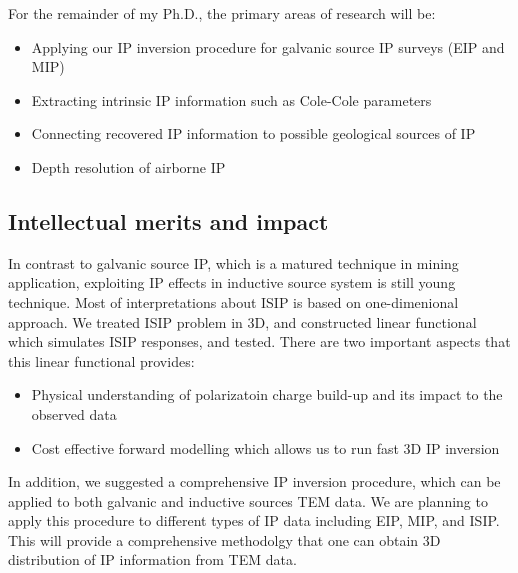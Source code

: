 \documentclass[letterpaper,11pt]{article}
\begin{document}
For the remainder of my Ph.D., the primary areas of research will be:
\begin{itemize}
  \item Applying our IP inversion procedure for galvanic source IP surveys (EIP and MIP)
  \item Extracting intrinsic IP information such as Cole-Cole parameters
  \item Connecting recovered IP information to possible geological sources of IP
  \item Depth resolution of airborne IP
\end{itemize}

\subsection{Intellectual merits and impact}
In contrast to galvanic source IP, which is a matured technique in mining application, exploiting IP effects in inductive source system is still young technique. Most of interpretations about ISIP is based on one-dimenional approach. We treated ISIP problem in 3D, and constructed linear functional which simulates ISIP responses, and tested. There are two important aspects that this linear functional provides:
\begin{itemize}
  \item Physical understanding of polarizatoin charge build-up and its impact to the observed data
  \item Cost effective forward modelling which allows us to run fast 3D IP inversion
\end{itemize}
In addition,  we suggested a comprehensive IP inversion procedure, which can be applied to both galvanic and inductive sources TEM data. We are planning to apply this procedure to different types of IP data including EIP, MIP, and ISIP. This will provide a comprehensive methodolgy that one can obtain 3D distribution of IP information from TEM data.
\end{document}
